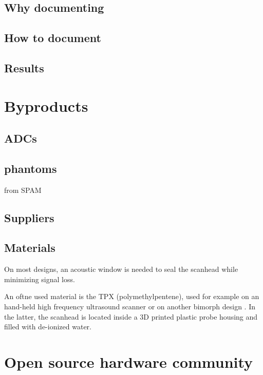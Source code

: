 \documentclass[conference]{IEEEtran}
\begin{document}
\subsection{Why documenting}

\subsection{How to document}

\subsection{Results}
 
 
 
\section{Byproducts}

\subsection{ADCs}

\subsection{phantoms}

\cite{nolting_inexpensive_2016} from SPAM

\subsection{Suppliers}


\subsection{Materials}


On most designs, an acoustic window is needed to seal the scanhead while minimizing signal loss.

An oftne used material is the TPX (polymethylpentene), used for example on an hand-held high frequency ultrasound scanner  \cite{erickson_hand-held_2001} or on another bimorph design \cite{brown_low_2013}. In the latter, the scanhead is located inside a 3D printed plastic probe housing and filled with de-ionized water.

\section{Open source hardware community}
\end{document}
